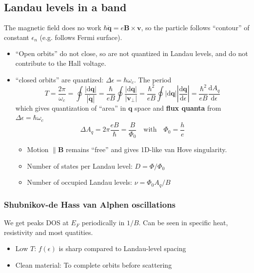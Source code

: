 \documentclass[11pt,letterpaper]{article}
\numberwithin{equation}{section} %
\renewcommand*{\vec}[1]{\bm{#1}}
\newcommand{\dif}{\mathrm d}
\begin{document}
\subsection{Landau levels in a band}
\label{sub:landau_levels_in_a_band}
The magnetic field does no work $\hbar\dot{\vec{q}} = e\vec B\times\vec v$, so
the particle follows ``contour'' of constant $\epsilon_n$ (e.g. follows Fermi surface). 
\begin{itemize}
  \item ``Open orbits'' do not close, so are not quantized in Landau levels,
	  and do not contribute to the Hall voltage. 
  \item ``closed orbits'' are quantized: $\Delta \epsilon = \hbar \omega_c$. 
	  The period 
	  \begin{equation}
		  T = \frac{2\pi}{\omega_c} = \oint\frac{|\dif\vec q|}{|\dot{\vec{q}}|}
		  = \frac{\hbar}{e B}\oint\frac{|\dif\vec q|}{|\vec v_\perp|}
		  = \frac{\hbar^2}{eB}\oint|\dif \vec q|\left|\frac{\dif\vec
		  q}{\dif\epsilon}\right| 
		  = \frac{\hbar^2}{eB}\frac{\dif A_q}{\dif\epsilon}
	  \end{equation}
	  which gives quantization of ``area'' in $\vec q$ space and \textbf{flux
	  quanta} from $\Delta \epsilon = \hbar\omega_c$
	  \begin{equation}
		  \Delta A_q = 2\pi\frac{eB}{\hbar} = \frac{B}{\Phi_0} 
		  \mbox{~~~with~~~}
		  \Phi_0 = \frac he
	  \end{equation}
	  \begin{itemize}
	    \item Motion $\parallel \vec B$ remains ``free'' and gives 1D-like
			van Hove singularity. 
		\item Number of states per Landau level: $D = \Phi/\Phi_0$
		\item Number of occupied Landau levels: $\nu = \Phi_0 A_q/B$
	  \end{itemize}
\end{itemize}

\subsubsection{Shubnikov-de Hass van Alphen oscillations}
\label{ssub:Shubnikov-de Hass van Alphen oscillations}
We get peaks DOS at $E_F$ periodically in $1/B$. Can be seen in specific
heat, resistivity and most quatities.
\begin{itemize}
  \item Low $T$: $f(\epsilon)$ is sharp compared to Landau-level spacing
  \item Clean material: To complete orbits before scattering
\end{itemize}
\end{document}
